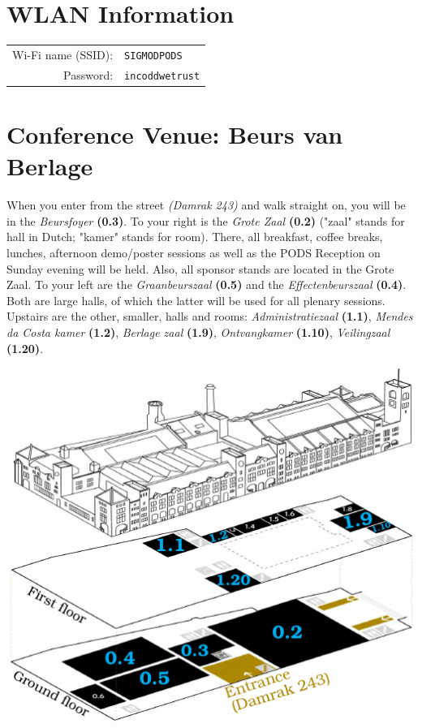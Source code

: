 
\clearpage
\ifodd\value{page}\hbox{}\newpage\fi

\section{WLAN Information}

\begin{tabular}{rl}
Wi-Fi name (SSID): & \texttt{SIGMODPODS} \\
Password:          & \texttt{incoddwetrust}
\end{tabular}

\section{Conference Venue: Beurs van Berlage}

When you enter from the street \emph{(Damrak 243)} and walk straight on, you will be in the \emph{Beursfoyer} \textbf{(0.3)}. To your right is the \emph{Grote Zaal} \textbf{(0.2)} ("zaal" stands for hall in Dutch; "kamer" stands for room). There, all breakfast, coffee breaks, lunches, afternoon demo/poster sessions as well as the PODS Reception on Sunday evening will be held. Also, all sponsor stands are located in the Grote Zaal. To your left are the \emph{Graanbeurszaal} \textbf{(0.5)} and the \emph{Effectenbeurszaal} \textbf{(0.4)}. Both are large halls, of which the latter will be used for all plenary sessions. Upstairs are the other, smaller, halls and rooms: \emph{Administratiezaal} \textbf{(1.1)}, \emph{Mendes da Costa kamer} \textbf{(1.2)}, \emph{Berlage zaal} \textbf{(1.9)}, \emph{Ontvangkamer} \textbf{(1.10)}, \emph{Veilingzaal} \textbf{(1.20)}.

\includegraphics[width=.95\textwidth]{images/BvB-plan-3D-85mm-x-1__mm.pdf}%

